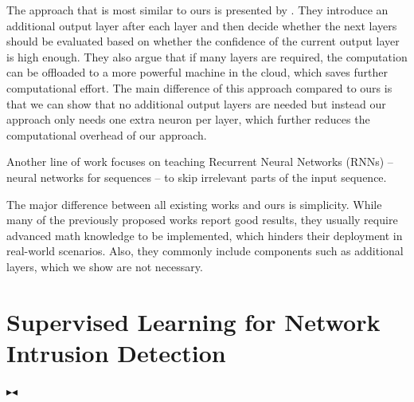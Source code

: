 \documentclass[conference]{IEEEtran}
\newcommand{\mynote}[3]{
    \fbox{\bfseries\sffamily\scriptsize#1}
    {\small$\blacktriangleright$\textsf{\emph{\color{#3}{#2}}}$\blacktriangleleft$}}
\newcommand{\todo}[1]{\mynote{TODO}{#1}{red}}
\begin{document}
The approach that is most similar to ours is presented by \cite{leroux_cascading_2017}. They introduce an additional output layer after each layer and then decide whether the next layers should be evaluated based on whether the confidence of the current output layer is high enough. They also argue that if many layers are required, the computation can be offloaded to a more powerful machine in the cloud, which saves further computational effort. The main difference of this approach compared to ours is that we can show that no additional output layers are needed but instead our approach only needs one extra neuron per layer, which further reduces the computational overhead of our approach.

Another line of work \cite{seo_neural_2018,yu_learning_2017, graves_adaptive_2017, bachl_sparseids_2020} focuses on teaching Recurrent Neural Networks (RNNs) -- neural networks for sequences -- to skip irrelevant parts of the input sequence.

The major difference between all existing works and ours is simplicity. While many of the previously proposed works report good results, they usually require advanced math knowledge to be implemented, which hinders their deployment in real-world scenarios. Also, they commonly include components such as additional layers, which we show are not necessary. 

\section{Supervised Learning for Network Intrusion Detection}

\todo{Max: Add missing references}
\end{document}
